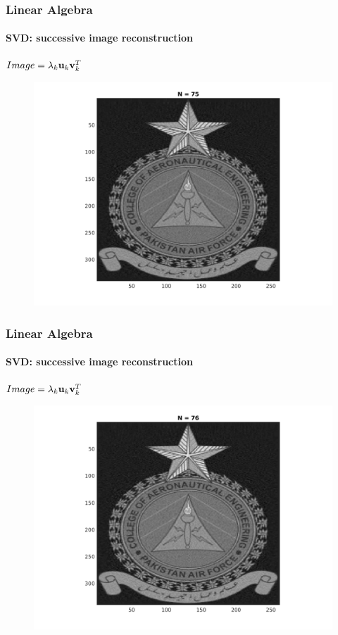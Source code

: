 \documentclass[hyperref={pdfpagelabels=true}]{beamer}
\begin{document}
\begin{frame}
\frametitle{Linear Algebra}
\framesubtitle{SVD: successive image reconstruction} 
\small{
\begin{center}
$Image = \lambda_k{\bf u}_k {\bf v}_k^T$
\end{center}}
\begin{figure}[!htb]
\centering
\includegraphics [scale=0.48]{n/b75.png}
\end{figure}
\end{frame}

\begin{frame}
\frametitle{Linear Algebra}
\framesubtitle{SVD: successive image reconstruction} 
\small{
\begin{center}
$Image = \lambda_k{\bf u}_k {\bf v}_k^T$
\end{center}}
\begin{figure}[!htb]
\centering
\includegraphics [scale=0.48]{n/b76.png}
\end{figure}
\end{frame}
\end{document}
